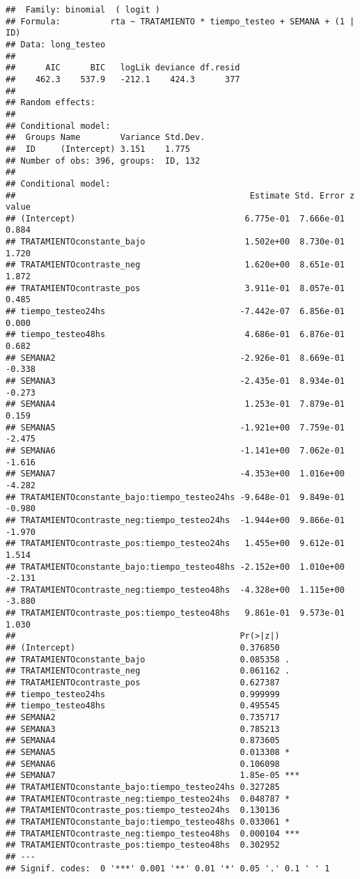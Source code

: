 \documentclass[
]{article}
\begin{document}
\begin{verbatim}
##  Family: binomial  ( logit )
## Formula:          rta ~ TRATAMIENTO * tiempo_testeo + SEMANA + (1 | ID)
## Data: long_testeo
## 
##      AIC      BIC   logLik deviance df.resid 
##    462.3    537.9   -212.1    424.3      377 
## 
## Random effects:
## 
## Conditional model:
##  Groups Name        Variance Std.Dev.
##  ID     (Intercept) 3.151    1.775   
## Number of obs: 396, groups:  ID, 132
## 
## Conditional model:
##                                               Estimate Std. Error z value
## (Intercept)                                  6.775e-01  7.666e-01   0.884
## TRATAMIENTOconstante_bajo                    1.502e+00  8.730e-01   1.720
## TRATAMIENTOcontraste_neg                     1.620e+00  8.651e-01   1.872
## TRATAMIENTOcontraste_pos                     3.911e-01  8.057e-01   0.485
## tiempo_testeo24hs                           -7.442e-07  6.856e-01   0.000
## tiempo_testeo48hs                            4.686e-01  6.876e-01   0.682
## SEMANA2                                     -2.926e-01  8.669e-01  -0.338
## SEMANA3                                     -2.435e-01  8.934e-01  -0.273
## SEMANA4                                      1.253e-01  7.879e-01   0.159
## SEMANA5                                     -1.921e+00  7.759e-01  -2.475
## SEMANA6                                     -1.141e+00  7.062e-01  -1.616
## SEMANA7                                     -4.353e+00  1.016e+00  -4.282
## TRATAMIENTOconstante_bajo:tiempo_testeo24hs -9.648e-01  9.849e-01  -0.980
## TRATAMIENTOcontraste_neg:tiempo_testeo24hs  -1.944e+00  9.866e-01  -1.970
## TRATAMIENTOcontraste_pos:tiempo_testeo24hs   1.455e+00  9.612e-01   1.514
## TRATAMIENTOconstante_bajo:tiempo_testeo48hs -2.152e+00  1.010e+00  -2.131
## TRATAMIENTOcontraste_neg:tiempo_testeo48hs  -4.328e+00  1.115e+00  -3.880
## TRATAMIENTOcontraste_pos:tiempo_testeo48hs   9.861e-01  9.573e-01   1.030
##                                             Pr(>|z|)    
## (Intercept)                                 0.376850    
## TRATAMIENTOconstante_bajo                   0.085358 .  
## TRATAMIENTOcontraste_neg                    0.061162 .  
## TRATAMIENTOcontraste_pos                    0.627387    
## tiempo_testeo24hs                           0.999999    
## tiempo_testeo48hs                           0.495545    
## SEMANA2                                     0.735717    
## SEMANA3                                     0.785213    
## SEMANA4                                     0.873605    
## SEMANA5                                     0.013308 *  
## SEMANA6                                     0.106098    
## SEMANA7                                     1.85e-05 ***
## TRATAMIENTOconstante_bajo:tiempo_testeo24hs 0.327285    
## TRATAMIENTOcontraste_neg:tiempo_testeo24hs  0.048787 *  
## TRATAMIENTOcontraste_pos:tiempo_testeo24hs  0.130136    
## TRATAMIENTOconstante_bajo:tiempo_testeo48hs 0.033061 *  
## TRATAMIENTOcontraste_neg:tiempo_testeo48hs  0.000104 ***
## TRATAMIENTOcontraste_pos:tiempo_testeo48hs  0.302952    
## ---
## Signif. codes:  0 '***' 0.001 '**' 0.01 '*' 0.05 '.' 0.1 ' ' 1
\end{verbatim}
\end{document}
